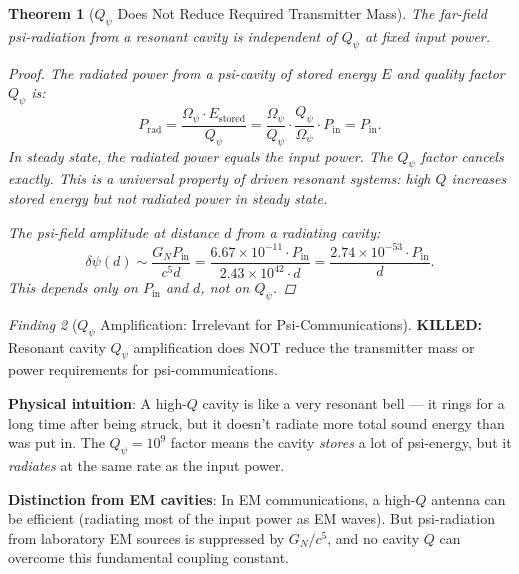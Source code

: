 \documentclass[11pt]{article}
\newtheorem{theorem}{Theorem}[section]
\theoremstyle{definition}
\theoremstyle{remark}
\newtheorem{finding}[theorem]{Finding}
\newcommand{\ee}[1]{\times10^{#1}}
\newcommand{\Qpsi}{Q_\psi}
\newcommand{\Opsi}{\Omega_\psi}
\newcommand{\GN}{G_N}
\newcommand{\killed}[1]{\textcolor{red!70!black}{\textbf{KILLED:} #1}}
\begin{document}
\begin{theorem}[$\Qpsi$ Does Not Reduce Required Transmitter Mass]
\label{thm:Q-no-help}
The far-field psi-radiation from a resonant cavity is independent of $\Qpsi$
at fixed input power.

\begin{proof}
The radiated power from a psi-cavity of stored energy $E$ and quality factor
$\Qpsi$ is:
\begin{equation}
P_{\mathrm{rad}} = \frac{\Opsi \cdot E_{\mathrm{stored}}}{\Qpsi}
= \frac{\Opsi}{\Qpsi} \cdot \frac{\Qpsi}{\Opsi} \cdot P_{\mathrm{in}}
= P_{\mathrm{in}}.
\label{eq:P-rad}
\end{equation}
In steady state, the radiated power equals the input power. The $\Qpsi$
factor cancels exactly. This is a universal property of driven resonant
systems: high $Q$ increases stored energy but \emph{not} radiated power
in steady state.

The psi-field amplitude at distance $d$ from a radiating cavity:
\begin{equation}
\delta\psi(d) \sim \frac{\GN P_{\mathrm{in}}}{c^5 d}
= \frac{6.67\ee{-11} \cdot P_{\mathrm{in}}}{2.43\ee{42} \cdot d}
= \frac{2.74\ee{-53} \cdot P_{\mathrm{in}}}{d}.
\label{eq:psi-rad-field}
\end{equation}
This depends only on $P_{\mathrm{in}}$ and $d$, not on $\Qpsi$.
\end{proof}
\end{theorem}

\begin{finding}[$\Qpsi$ Amplification: Irrelevant for Psi-Communications]
\label{find:Q-irrelevant}
\killed{Resonant cavity $\Qpsi$ amplification does NOT reduce the
transmitter mass or power requirements for psi-communications.}

\textbf{Physical intuition}: A high-$Q$ cavity is like a very resonant
bell --- it rings for a long time after being struck, but it doesn't
radiate more total sound energy than was put in. The $\Qpsi = 10^9$
factor means the cavity \emph{stores} a lot of psi-energy, but it
\emph{radiates} at the same rate as the input power.

\textbf{Distinction from EM cavities}: In EM communications, a high-$Q$
antenna can be efficient (radiating most of the input power as EM waves).
But psi-radiation from laboratory EM sources is suppressed by $\GN/c^5$,
and no cavity $Q$ can overcome this fundamental coupling constant.
\end{finding}
\end{document}
